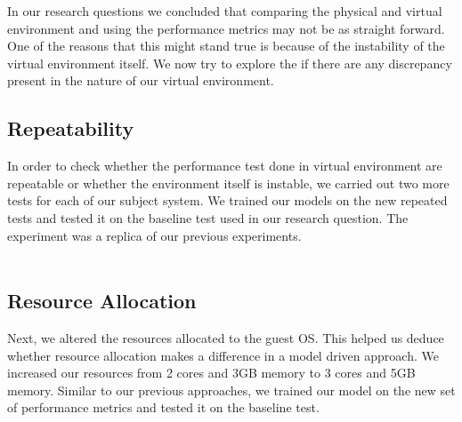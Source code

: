 In our research questions we concluded that comparing the physical and virtual environment and using the performance metrics may not be as straight forward. One of the reasons that this might stand true is because of the instability of the virtual environment itself. We now try to explore the if there are any discrepancy present in the nature of our virtual environment.

\subsection{Repeatability}
In order to check whether the performance test done in virtual environment are repeatable or whether the environment itself is instable, we carried out two more tests for each of our subject system. We trained our models on the new repeated tests and tested it on the baseline test used in our research question. The experiment was a replica of our previous experiments.
\\
\\




\subsection{Resource Allocation}
Next, we altered the resources allocated to the guest OS. This helped us deduce whether resource allocation makes a difference in a model driven approach. We increased our resources from 2 cores and 3GB memory to 3 cores and 5GB memory. Similar to our previous approaches, we trained our model on the new set of performance metrics and tested it on the baseline test.
\\
\\


